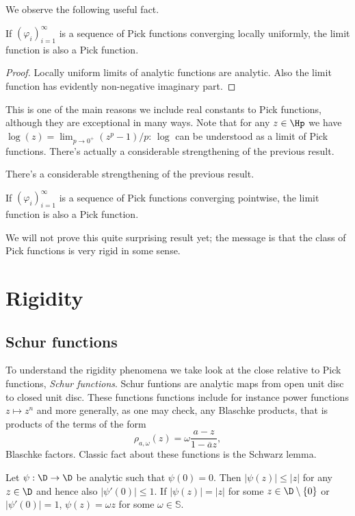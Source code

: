 We observe the following useful fact.

\begin{prop}
	If $(\varphi_{i})_{i = 1}^{\infty}$ is a sequence of Pick functions converging locally uniformly, the limit function is also a Pick function.
\end{prop}
\begin{proof}
	Locally uniform limits of analytic functions are analytic. Also the limit function has evidently non-negative imaginary part.
\end{proof}

This is one of the main reasons we include real constants to Pick functions, although they are exceptional in many ways. Note that for any $z \in \Hp$ we have $\log(z) = \lim_{p \to 0^{+}}(z^p - 1)/p$: $\log$ can be understood as a limit of Pick functions. There's actually a considerable strengthening of the previous result.

There's a considerable strengthening of the previous result.

\begin{prop}\label{pick_convergence}
	If $(\varphi_{i})_{i = 1}^{\infty}$ is a sequence of Pick functions converging pointwise, the limit function is also a Pick function.
\end{prop}

We will not prove this quite surprising result yet; the message is that the class of Pick functions is very rigid in some sense.

\section{Rigidity}

\subsection{Schur functions}

To understand the rigidity phenomena we take look at the close relative to Pick functions, \textit{Schur functions}. Schur funtions are analytic maps from open unit disc to closed unit disc. These functions functions include for instance power functions $z \mapsto z^{n}$ and more generally, as one may check, any Blaschke products, that is products of the terms of the form
\[
	\rho_{a, \omega}(z) = \omega \frac{a - z}{1 - \overline{a} z},
\]
Blaschke factors. Classic fact about these functions is the Schwarz lemma.

\begin{lause}
	Let $\psi : \D \to \D$ be analytic such that $\psi(0) = 0$. Then $|\psi(z)| \leq |z|$ for any $z \in \D$ and hence also $|\psi'(0)| \leq 1$. If $|\psi(z)| = |z|$ for some $z \in \D \setminus \{0\}$ or $|\psi'(0)| = 1$, $\psi(z) = \omega z$ for some $\omega \in \mathbb{S}$.
\end{lause}

